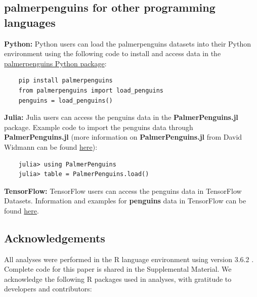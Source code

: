 \hypertarget{palmerpenguins-for-other-programming-languages}{%
\subsection{palmerpenguins for other programming
languages}\label{palmerpenguins-for-other-programming-languages}}

\textbf{Python:} Python users can load the palmerpenguins datasets into
their Python environment using the following code to install and access
data in the
\href{https://pypi.org/project/palmerpenguins/}{palmerpenguins Python
package}:

\begin{verbatim}
    pip install palmerpenguins
    from palmerpenguins import load_penguins
    penguins = load_penguins()
\end{verbatim}

\textbf{Julia:} Julia users can access the penguins data in the
\textbf{PalmerPenguins.jl} package. Example code to import the penguins
data through \textbf{PalmerPenguins.jl} (more information on
\textbf{PalmerPenguins.jl} from David Widmann can be found
\href{https://github.com/devmotion/PalmerPenguins.jl}{here}):

\begin{verbatim}
    julia> using PalmerPenguins
    julia> table = PalmerPenguins.load()
\end{verbatim}

\textbf{TensorFlow:} TensorFlow users can access the penguins data in
TensorFlow Datasets. Information and examples for \textbf{penguins} data
in TensorFlow can be found
\href{https://www.tensorflow.org/datasets/catalog/penguins}{here}.

\hypertarget{acknowledgements}{%
\subsection{Acknowledgements}\label{acknowledgements}}

All analyses were performed in the R language environment using version
3.6.2 \citep{r_core_team_r_2019}. Complete code for this paper is shared
in the Supplemental Material. We acknowledge the following R packages
used in analyses, with gratitude to developers and contributors:

